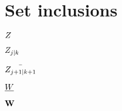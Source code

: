 \section{Set inclusions}
\label{sec:set inclusions}

%
%

$Z$

$Z_{j|k}$

$\bar{Z_{j+1|k+1}}$

$\underline{W}$

$\mathbf{W}$